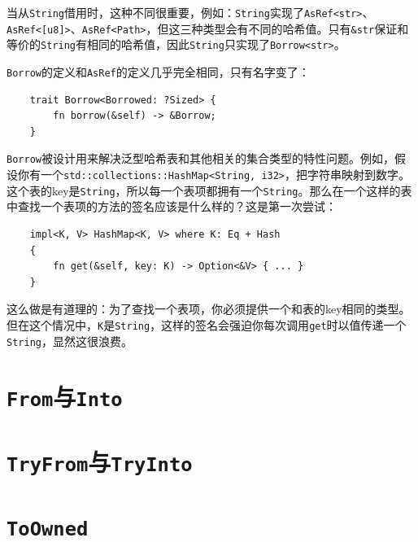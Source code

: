 当从\texttt{String}借用时，这种不同很重要，例如：\texttt{String}实现了\texttt{AsRef<str>}、\texttt{AsRef<[u8]>}、\texttt{AsRef<Path>}，但这三种类型会有不同的哈希值。只有\texttt{\&str}保证和等价的\texttt{String}有相同的哈希值，因此\texttt{String}只实现了\texttt{Borrow<str>}。

\texttt{Borrow}的定义和\texttt{AsRef}的定义几乎完全相同，只有名字变了：
\begin{verbatim}
    trait Borrow<Borrowed: ?Sized> {
        fn borrow(&self) -> &Borrow;
    }
\end{verbatim}

\texttt{Borrow}被设计用来解决泛型哈希表和其他相关的集合类型的特性问题。例如，假设你有一个\texttt{std::collections::HashMap<String, i32>}，把字符串映射到数字。这个表的key是\texttt{String}，所以每一个表项都拥有一个\texttt{String}。那么在一个这样的表中查找一个表项的方法的签名应该是什么样的？这是第一次尝试：
\begin{verbatim}
    impl<K, V> HashMap<K, V> where K: Eq + Hash
    {
        fn get(&self, key: K) -> Option<&V> { ... }
    }
\end{verbatim}

这么做是有道理的：为了查找一个表项，你必须提供一个和表的key相同的类型。但在这个情况中，\texttt{K}是\texttt{String}，这样的签名会强迫你每次调用\texttt{get}时以值传递一个\texttt{String}，显然这很浪费。

\section{\texttt{From}与\texttt{Into}}\label{from}

\section{\texttt{TryFrom}与\texttt{TryInto}}\label{tryfrom}

\section{\texttt{ToOwned}}\label{toowned}
